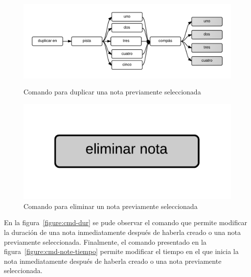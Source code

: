 \begin{figure}[H]
\begin{minipage}[b]{0.5\linewidth}
\centering
\includegraphics[width=1.2\linewidth]{./graphics/cmd-dup-nota.png}
\caption{Comando para duplicar una nota previamente seleccionada}
\label{figure:cmd-dup-nota}
\end{minipage}
\quad
\begin{minipage}[b]{0.5\linewidth}
\centering
\includegraphics[width=0.5\linewidth]{./graphics/del-note.png}
\caption{Comando para eliminar un nota previamente seleccionada}
\label{figure:cmd-del-nota}
\end{minipage}
\end{figure}

En la figura~\ref{figure:cmd-dur} se pude observar el comando que permite modificar la duraci\'on de 
una nota inmediatamente despu\'es de haberla creado o una nota previamente seleccionada. Finalmente, el comando
presentado en la figura~\ref{figure:cmd-note-tiempo} permite modificar el tiempo en el que inicia la 
nota inmediatamente despu\'es de haberla creado o una nota previamente seleccionada.

